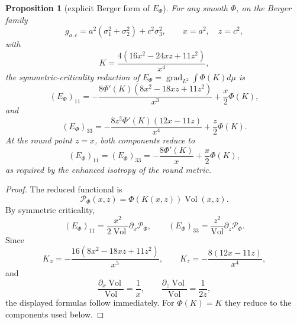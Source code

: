 \documentclass[11pt]{amsart}
\newtheorem{proposition}{Proposition}
\newcommand{\grad}{\operatorname{grad}}
\newcommand{\Vol}{\operatorname{Vol}}
\begin{document}
\begin{proposition}[explicit Berger form of \(E_\Phi\)]\label{prop:Ephi}
For any smooth \(\Phi\), on the Berger family
\[
        g_{a,c}=a^2(\sigma_1^2+\sigma_2^2)+c^2\sigma_3^2,
        \qquad x=a^2,\quad z=c^2,
\]
with
\[
        K=\frac{4(16x^2-24xz+11z^2)}{x^4},
\]
the symmetric-criticality reduction of \(E_\Phi=\grad_{L^2}\int\Phi(K)d\mu\)
is
\[
\boxed{
        (E_\Phi)_{11}
        =
        -\frac{8\Phi'(K)(8x^2-18xz+11z^2)}{x^3}
        +
        \frac{x}{2}\Phi(K),
}
\]
and
\[
\boxed{
        (E_\Phi)_{33}
        =
        -\frac{8z^2\Phi'(K)(12x-11z)}{x^4}
        +
        \frac{z}{2}\Phi(K).
}
\]
At the round point \(z=x\), both components reduce to
\[
        (E_\Phi)_{11}=(E_\Phi)_{33}
        =
        -\frac{8\Phi'(K)}{x}
        +
        \frac{x}{2}\Phi(K),
\]
as required by the enhanced isotropy of the round metric.
\end{proposition}

\begin{proof}
The reduced functional is
\[
        \mathcal P_\Phi(x,z)=\Phi(K(x,z))\Vol(x,z).
\]
By symmetric criticality,
\[
        (E_\Phi)_{11}
        =
        \frac{x^2}{2\Vol}\partial_x\mathcal P_\Phi,
        \qquad
        (E_\Phi)_{33}
        =
        \frac{z^2}{\Vol}\partial_z\mathcal P_\Phi .
\]
Since
\[
        K_x=
        -\frac{16(8x^2-18xz+11z^2)}{x^5},
        \qquad
        K_z=
        -\frac{8(12x-11z)}{x^4},
\]
and
\[
        \frac{\partial_x\Vol}{\Vol}=\frac1x,\qquad
        \frac{\partial_z\Vol}{\Vol}=\frac1{2z},
\]
the displayed formulas follow immediately.  For \(\Phi(K)=K\) they reduce to
the components used below.
\end{proof}
\end{document}
